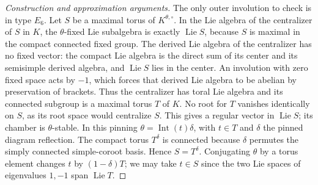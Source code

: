 \documentclass[11pt,a4paper,openany,oneside]{book}
\theoremstyle{resultstyle}
\theoremstyle{definition}
\numberwithin{equation}{chapter}
\begin{document}
\begin{proof}[Construction and approximation arguments]
The only outer involution to check is in type \(E_6\).
Let \(S\) be a maximal torus of \(K^{\theta,\circ}\).
In the Lie algebra of the centralizer of \(S\) in \(K\), the
\(\theta\)-fixed Lie subalgebra is exactly \(\operatorname{Lie}S\),
because \(S\) is maximal in the compact connected fixed group.
The derived Lie algebra of the centralizer has no fixed vector:
the compact Lie algebra is the direct sum of its center and
its semisimple derived algebra, and \(\operatorname{Lie}S\)
lies in the center. An involution with zero fixed space acts
by \(-1\), which forces that derived Lie algebra to be abelian
by preservation of brackets. Thus the centralizer has toral
Lie algebra and its connected subgroup is a maximal torus \(T\)
of \(K\). No root for \(T\) vanishes identically on \(S\), as
its root space would centralize \(S\). This gives a regular
vector in \(\operatorname{Lie}S\); its chamber is \(\theta\)-stable.
In this pinning \(\theta=\operatorname{Int}(t)\delta\), with
\(t\in T\) and \(\delta\) the pinned diagram reflection.
The compact torus \(T^\delta\) is connected because \(\delta\)
permutes the simply connected simple-coroot basis. Hence
\(S=T^\delta\). Conjugating \(\theta\) by a torus element changes
\(t\) by \((1-\delta)T\); we may take \(t\in S\) since the two
Lie spaces of eigenvalues \(1,-1\) span \(\operatorname{Lie}T\).


\end{proof}
\end{document}
